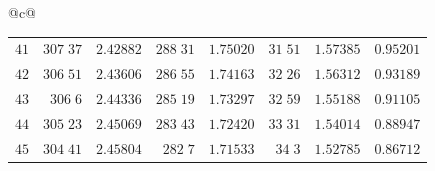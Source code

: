 \begin{center}
{\begin{tabular}{@{}c@{}}
\begin{tabular}{r|r|r|r|r|r|r|r}
$41$&$307\;37$&$2.42882$&$288\;31$&$1.75020$&$31\;51$&$1.57385$&$0.95201$\\
$42$&$306\;51$&$2.43606$&$286\;55$&$1.74163$&$32\;26$&$1.56312$&$0.93189$\\
$43$&$306\;6$&$2.44336$&$285\;19$&$1.73297$&$32\;59$&$1.55188$&$0.91105$\\
$44$&$305\;23$&$2.45069$&$283\;43$&$1.72420$&$33\;31$&$1.54014$&$0.88947$\\[2pt]
$45$&$304\;41$&$2.45804$&$282\;7$&$1.71533$&$34\;3$&$1.52785$&$0.86712$\\
\end{tabular}
\end{tabular}%
}
\end{center}
\endgroup
\clearpage
{}
\begingroup
\fontsize{9}{10.2}\selectfont
\setlength{\tabcolsep}{1.5pt}
\renewcommand{\arraystretch}{1.02}
